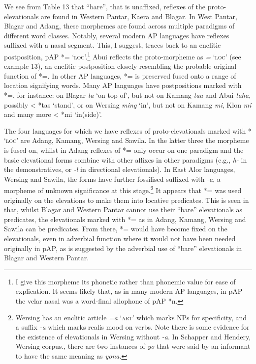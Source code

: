  We see from Table 13 that ``bare'', that is unaffixed, reflexes of the proto-elevationals are found in Western Pantar, Kaera and Blagar. In West Pantar, Blagar and  Adang, these morphemes are found across multiple paradigms of different word classes. Notably, several modern AP languages have reflexes suffixed with a nasal segment. This, I suggest, traces back to an enclitic postposition, pAP *={\ng} `\textsc{loc}'.\footnote{{}  I give this morpheme its phonetic rather than phonemic value for ease of explication. It seems likely that, as in many modern AP languages, in pAP the velar nasal was a word-final allophone of pAP *n.}  Abui reflects the proto-morpheme as \textit{=}\textit{{\ng}} `\textsc{loc}' (see example 13), an enclitic postposition closely resembling the probable original function of *={\ng}. In other AP languages, *={\ng} is preserved fused onto a range of location signifying words. Many AP languages have postpositions marked with *={\ng}, for instance: on Blagar \textit{ta}\textit{{\ng}} `on top of', but not on Kamang \textit{taa} and Abui \textit{taha}, possibly {\textless} *tas `stand', or on Wersing \textit{ming} `in', but not on Kamang \textit{mi}, Klon \textit{mi} and many more {\textless} *mi `in(side)'.

The four languages for which we have reflexes of proto-elevationals marked with *{\ng} `\textsc{loc}' are Adang, Kamang, Wersing and Sawila. In the latter three the morpheme is fused on, whilst in Adang reflexes of *={\ng} only occur on one paradigm and the basic elevational forms combine with other affixes in other paradigms (e.g., \textit{h}\textit{{\textepsilon}}\textit{{}-} in the demonstratives, or \textit{{}-l}\textit{{\textepsilon}} in directional elevationals). In East Alor languages, Wersing and Sawila, the forms have further fossilised suffixed with \textit{{}-a}, a morpheme of unknown significance at this stage.\footnote{{}  Wersing has an enclitic article \textit{=a} `\textsc{art}' which marks NPs for specificity, and a suffix \textit{{}-a} which marks realis mood on verbs. Note there is some evidence for the existence of elevationals in Wersing without \textit{{}-a}. In Schapper and Hendery, Wersing corpus., there are two instances of \textit{yo{\ng}} that were said by an informant to have the same meaning as \textit{yona}.} It appears that *={\ng} was used originally on the elevations to make them into locative predicates. This is seen in that, whilst Blagar and Western Pantar cannot use their ``bare'' elevationals as predicates, the elevationals marked with *={\ng} as in Adang, Kamang, Wersing and Sawila can be predicates. From there, *={\ng} would have become fixed on the elevationals, even in adverbial function where it would not have been needed originally in pAP, as is suggested by the adverbial use of ``bare'' elevationals in Blagar and Western Pantar.


